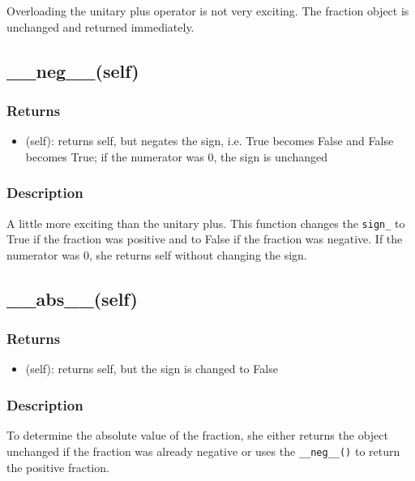 \documentclass[refman]{scrartcl}
\begin{document}
Overloading the unitary plus operator is not very exciting. The fraction object is unchanged and returned immediately.

\subsection{\_\_neg\_\_(self)}

\subsubsection*{Returns}

\begin{itemize}
	\item (self): returns self, but negates the sign, i.e. True becomes False and False becomes True; if the numerator was 0, the sign is unchanged
  \end{itemize}

\subsubsection*{Description}

A little more exciting than the unitary plus. This function changes the \texttt{sign\_} to True if the fraction was positive and to False if the fraction was negative. If the numerator was 0, she returns self without changing the sign.

\subsection{\_\_abs\_\_(self)}

\subsubsection*{Returns}

\begin{itemize}
	\item (self): returns self, but the sign is changed to False
\end{itemize}

\subsubsection*{Description}

To determine the absolute value of the fraction, she either returns the object unchanged if the fraction was already negative or uses the \texttt{\_\_neg\_\_()} to return the positive fraction.
\end{document}
